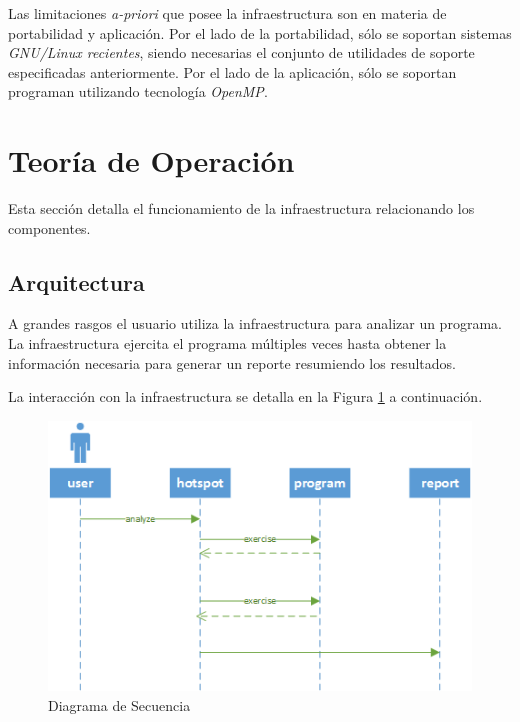 \documentclass[a4paper]{report}
\begin{document}
\bigskip

Las limitaciones {\it a-priori} que posee la infraestructura son en materia de portabilidad y aplicación. Por el lado de la portabilidad, sólo se soportan sistemas {\it GNU/Linux recientes}, siendo necesarias el conjunto de utilidades de soporte especificadas anteriormente. Por el lado de la aplicación, sólo se soportan programan utilizando tecnología {\it OpenMP}.

\section{Teoría de Operación}

Esta sección detalla el funcionamiento de la infraestructura relacionando los componentes.

\subsection{Arquitectura}

A grandes rasgos el usuario utiliza la infraestructura para analizar un programa.
La infraestructura ejercita el programa múltiples veces hasta obtener la información necesaria para generar un reporte resumiendo los resultados.

\bigskip

La interacción con la infraestructura se detalla en la Figura \ref{fig:hotspot-seq} a continuación.

\begin{figure}[H]
\begin{center}
\includegraphics[width=\textwidth]{hotspot-seq.png}
\caption{Diagrama de Secuencia}
\label{fig:hotspot-seq}
\end{center}
\end{figure}
\end{document}
